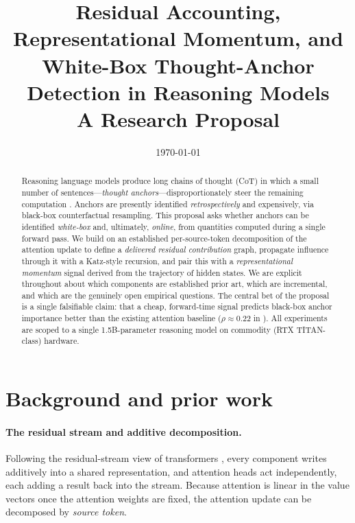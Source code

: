 \documentclass[11pt]{article}
\title{\textbf{Residual Accounting, Representational Momentum, and \\ White-Box Thought-Anchor Detection in Reasoning Models}\\[0.4em]
\large A Research Proposal}
\author{}
\date{\today}
\begin{document}
\maketitle

\begin{abstract}
\noindent
Reasoning language models produce long chains of thought (CoT) in which a small number of
sentences---\emph{thought anchors}---disproportionately steer the remaining computation
\cite{bogdan2025thought}. Anchors are presently identified \emph{retrospectively} and
expensively, via black-box counterfactual resampling. This proposal asks whether anchors
can be identified \emph{white-box} and, ultimately, \emph{online}, from quantities computed
during a single forward pass. We build on an established per-source-token decomposition of
the attention update \cite{kobayashi2020attention,kobayashi2021incorporating,ferrando2024information}
to define a \emph{delivered residual contribution} graph, propagate influence through it with a
Katz-style recursion, and pair this with a \emph{representational momentum} signal derived from
the trajectory of hidden states. We are explicit throughout about which components are
established prior art, which are incremental, and which are the genuinely open empirical
questions. The central bet of the proposal is a single falsifiable claim: that a cheap,
forward-time signal predicts black-box anchor importance better than the existing attention
baseline ($\rho \approx 0.22$ in \cite{bogdan2025thought}). All experiments are scoped to a
single 1.5B-parameter reasoning model on commodity (RTX TITAN-class) hardware.
\end{abstract}

\section{Background and prior work}

\paragraph{The residual stream and additive decomposition.}
Following the residual-stream view of transformers \cite{elhage2021mathematical}, every component
writes additively into a shared representation, and attention heads act independently, each
adding a result back into the stream. Because attention is linear in the value vectors once the
attention weights are fixed, the attention update can be decomposed by \emph{source token}.
\end{document}
